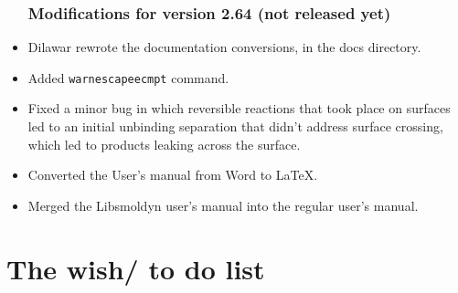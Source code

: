 \documentclass {scrbook}
\newcommand {\ttt} {\texttt}
\begin{document}
\begin{itemize}
\subsection*{Modifications for version 2.64 (not released yet)}
\item Dilawar rewrote the documentation conversions, in the docs directory.
\item Added \ttt{warnescapeecmpt} command.
\item Fixed a minor bug in which reversible reactions that took place on surfaces led to an initial unbinding separation that didn't address surface crossing, which led to products leaking across the surface.
\item Converted the User's manual from Word to LaTeX.
\item Merged the Libsmoldyn user's manual into the regular user's manual.

\end{itemize}


\chapter{The wish/ to do list}

\end{document}
